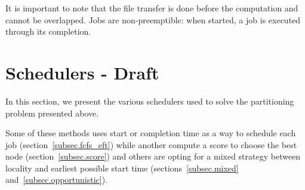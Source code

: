 \documentclass[conference,10pt]{IEEEtran}
\newcommand{\Node}[1]{\ensuremath{\mathrm{Node}_{#1}}\xspace}
\newcommand{\file}{\ensuremath{\mathit{File}}\xspace}
\newcommand{\size}{\ensuremath{\mathit{Size}}\xspace}
\newcommand{\bandwidth}{\mathit{BW}\xspace}
\newcommand{\walltime}{\mathit{WallTime}\xspace}
\newcommand{\start}{\mathit{StartTime}\xspace}
\begin{document}

It is important to note that the file transfer is done before the computation and cannot be overlapped.
Jobs are non-preemptible: when started, a job is executed through its completion.


\section{Schedulers - Draft}\label{sec.schedulers}

In this section, we present the various schedulers used to solve
the partitioning problem presented above. 

Some of these methods uses start or completion time as a way to
schedule each job (section~\ref{subsec.fcfs_eft}) while another compute 
a score to choose the best node (section~\ref{subsec.score}) and others
are opting for a mixed strategy between locality and earliest possible start time
(sections~\ref{subsec.mixed} and~\ref{subsec.opportunistic}).
\end{document}
